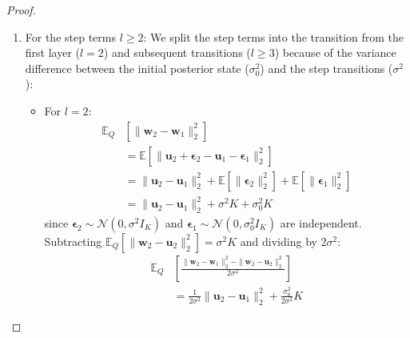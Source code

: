 \begin{proof}
\begin{enumerate}
    \item For the step terms $l \ge 2$:
    We split the step terms into the transition from the first layer ($l=2$) and subsequent transitions ($l \ge 3$) because of the variance difference between the initial posterior state ($\sigma_0^2$) and the step transitions ($\sigma^2$):
    \begin{itemize}
        \item For $l=2$:
        \begin{align}
        \mathbb{E}_{Q} &[\|\mathbf{w}_2 - \mathbf{w}_1\|_2^2] \nonumber \\
        &= \mathbb{E} [\|\mathbf{u}_2 + \boldsymbol{\epsilon}_2 - \mathbf{u}_1 - \boldsymbol{\epsilon}_1\|_2^2] \nonumber \\
        &= \|\mathbf{u}_2 - \mathbf{u}_1\|_2^2 + \mathbb{E}[\|\boldsymbol{\epsilon}_2\|_2^2] + \mathbb{E}[\|\boldsymbol{\epsilon}_1\|_2^2] \nonumber \\
        &= \|\mathbf{u}_2 - \mathbf{u}_1\|_2^2 + \sigma^2 K + \sigma_0^2 K
        \end{align}
        since $\boldsymbol{\epsilon}_2 \sim \mathcal{N}(0, \sigma^2 I_K)$ and $\boldsymbol{\epsilon}_1 \sim \mathcal{N}(0, \sigma_0^2 I_K)$ are independent. Subtracting $\mathbb{E}_Q [\|\mathbf{w}_2 - \mathbf{u}_2\|_2^2] = \sigma^2 K$ and dividing by $2\sigma^2$:
        \begin{equation}
        \begin{split}
        \mathbb{E}_{Q} &\left[ \frac{\|\mathbf{w}_2 - \mathbf{w}_1\|_2^2 - \|\mathbf{w}_2 - \mathbf{u}_2\|_2^2}{2\sigma^2} \right] \\
        &= \frac{1}{2\sigma^2} \|\mathbf{u}_2 - \mathbf{u}_1\|_2^2 + \frac{\sigma_0^2}{2\sigma^2} K
        \end{split}
        \end{equation}


\end{itemize}
\end{enumerate}
\end{proof}
